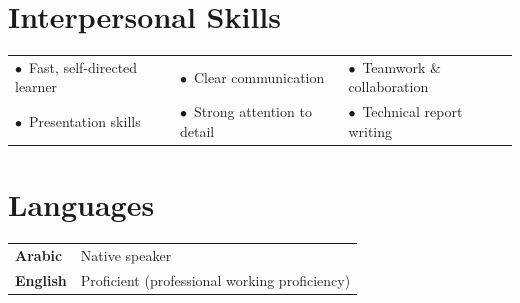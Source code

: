 \documentclass[11pt,a4paper]{article}
\begin{document}
\section{Interpersonal Skills}
\begin{tabularx}{\linewidth}{@{}>{\raggedright\arraybackslash}X >{\raggedright\arraybackslash}X >{\raggedright\arraybackslash}X@{}}
$\bullet$~Fast, self-directed learner & $\bullet$~Clear communication & $\bullet$~Teamwork \& collaboration \\[3pt]
$\bullet$~Presentation skills & $\bullet$~Strong attention to detail & $\bullet$~Technical report writing \\
\end{tabularx}

\section{Languages}
\begin{tabularx}{\linewidth}{@{}>{\raggedright\arraybackslash}p{4.2cm} X@{}}
\textbf{Arabic} & Native speaker \\[4pt]
\textbf{English} & Proficient (professional working proficiency) \\
\end{tabularx}
\end{document}
